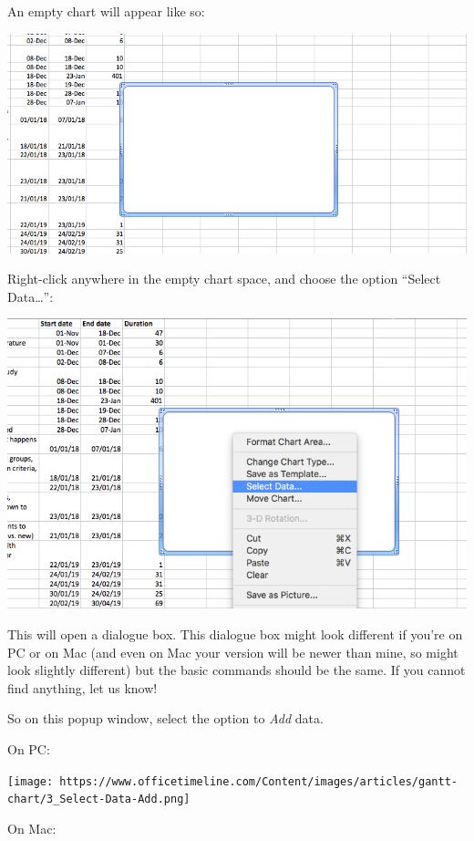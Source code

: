 \documentclass[]{book}
\theoremstyle{definition}
\theoremstyle{definition}
\theoremstyle{definition}
\theoremstyle{remark}
\begin{document}
An empty chart will appear like so:

\includegraphics{imgs/gantt_empty_chart.png}

Right-click anywhere in the empty chart space, and choose the option
``Select Data\ldots{}'':

\includegraphics{imgs/gantt_select_data.png}

This will open a dialogue box. This dialogue box might look different if
you're on PC or on Mac (and even on Mac your version will be newer than
mine, so might look slightly different) but the basic commands should be
the same. If you cannot find anything, let us know!

So on this popup window, select the option to \emph{Add} data.

On PC:

\texttt{[image: https://www.officetimeline.com/Content/images/articles/gantt-chart/3\_Select-Data-Add.png]}

On Mac:
\end{document}

